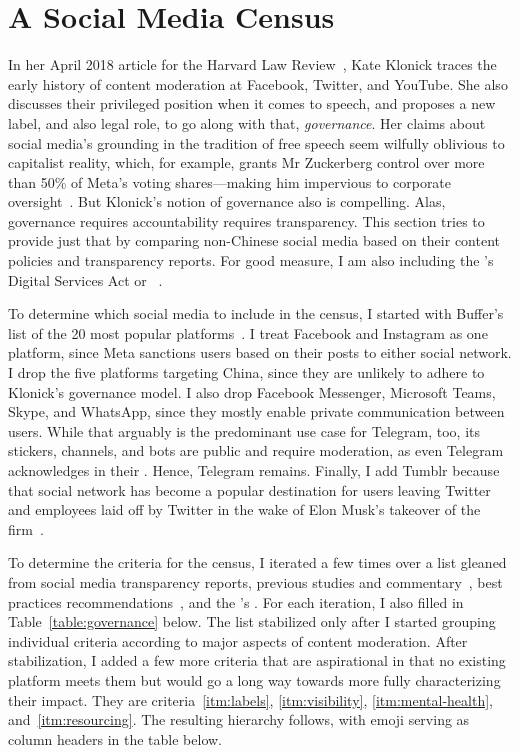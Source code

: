 \section{A Social Media Census}
\label{sec:census}

In her April 2018 article for the Harvard Law Review~\cite{Klonick2018}, Kate
Klonick traces the early history of content moderation at Facebook, Twitter, and
YouTube. She also discusses their privileged position when it comes to speech,
and proposes a new label, and also legal role, to go along with that,
\emph{governance}. Her claims about social media's grounding in the tradition of
free speech seem wilfully oblivious to capitalist reality, which, for example,
grants Mr Zuckerberg control over more than 50\% of Meta's voting
shares---making him impervious to corporate
oversight~\cite{LauricellaNorton2021}. But Klonick's notion of governance also
is compelling. Alas, governance requires accountability requires transparency.
This section tries to provide just that by comparing non-Chinese social media
based on their content policies and transparency reports. For good measure, I am
also including the \EU's Digital Services Act or
\DSA~\cite{EuropeanParliamentAndCouncil2022}.

To determine which social media to include in the census, I started with
Buffer's list of the 20 most popular platforms~\cite{Lua2022}. I treat Facebook
and Instagram as one platform, since Meta sanctions users based on their posts
to either social network. I drop the five platforms targeting China, since they
are unlikely to adhere to Klonick's governance model. I also drop Facebook
Messenger, Microsoft Teams, Skype, and WhatsApp, since they mostly enable
private communication between users. While that arguably is the predominant use
case for Telegram, too, its stickers, channels, and bots are public and require
moderation, as even Telegram acknowledges in their \FAQ. Hence, Telegram
remains. Finally, I add Tumblr because that social network has become a popular
destination for users leaving Twitter and employees laid off by Twitter in the
wake of Elon Musk's takeover of the firm~\cite{Patel2022}.

To determine the criteria for the census, I iterated a few times over a list
gleaned from social media transparency reports, previous studies and
commentary~\cite{BradfordGriselea2019,CrockerGebhartea2019,Douek2022}, best
practices
recommendations~\cite{AccessNowACLUFoundationOfNorthernCaliforniaea2021}, and
the \EU's \DSA. For each iteration, I also filled in
Table~\ref{table:governance} below. The list stabilized only after I started
grouping individual criteria according to major aspects of content moderation.
After stabilization, I added a few more criteria that are aspirational in that
no existing platform meets them but would go a long way towards more fully
characterizing their impact. They are criteria~\ref{itm:labels},
\ref{itm:visibility}, \ref{itm:mental-health}, and~\ref{itm:resourcing}. The
resulting hierarchy follows, with emoji serving as column headers in the table
below.

